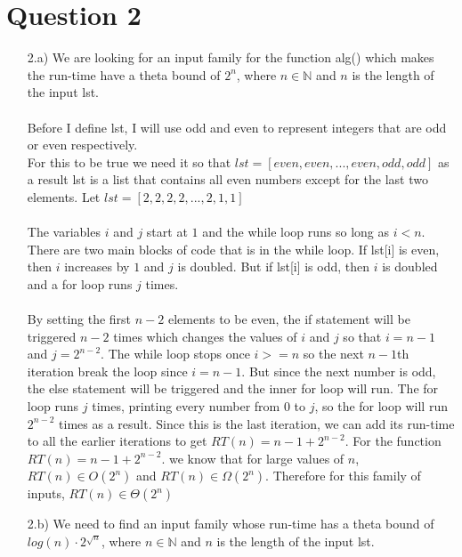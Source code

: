\documentclass[20pt]{article}
\begin{document}
\section*{Question 2}
\begin{enumerate}
    
    \item[2.a)] We are looking for an input family for the function alg() which makes the run-time have a theta bound of $2^n$, where $n \in \mathbb{N}$ and $n$ is the length of the input lst.\\\\
    Before I define lst, I will use odd and even to represent integers that are odd or even respectively.\\
    For this to be true we need it so that $lst = [even, even, ... , even, odd, odd]$ as a result lst is a list that contains all even numbers except for the last two elements. Let $lst = [2,2,2,2, ... ,2, 1, 1]$\\\\
    The variables $i$ and $j$ start at $1$ and the while loop runs so long as $i < n$. There are two main blocks of code that is in the while loop. If lst[i] is even, then $i$ increases by $1$ and $j$ is doubled. But if lst[i] is odd, then $i$ is doubled and a for loop runs $j$ times.\\\\
    By setting the first $n-2$ elements to be even, the if statement will be triggered $n-2$ times which changes the values of $i$ and $j$ so that $i = n-1$ and $j = 2^{n-2}$. The while loop stops once $i >= n$ so the next $n-1$th iteration break the loop since $i = n-1$. But since the next number is odd, the else statement will be triggered and the inner for loop will run. The for loop runs $j$ times, printing every number from 0 to $j$, so the for loop will run $2^{n-2}$ times as a result. Since this is the last iteration, we can add its run-time to all the earlier iterations to get $RT(n) = n-1 + 2^{n-2}$. For the function $RT(n) = n-1 + 2^{n-2}$. we know that for large values of $n$, $RT(n) \in O(2^{n})$ and $RT(n) \in\Omega(2^{n})$. Therefore for this family of inputs, $RT(n) \in \Theta(2^n)$ \hfill\Box
    
    
    \item[2.b)] We need to find an input family whose run-time has a theta bound of $log(n)\cdot 2^\sqrt{n}$, where $n\in\mathbb{N}$ and $n$ is the length of the input lst.\\
    

\end{enumerate}
\end{document}
